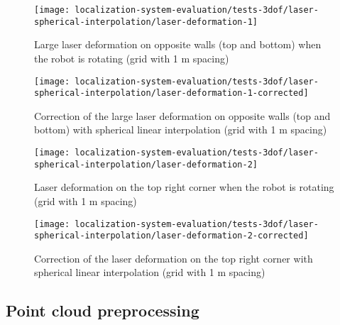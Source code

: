 \begin{figure}[H]
	\centering
	\texttt{[image: localization-system-evaluation/tests-3dof/laser-spherical-interpolation/laser-deformation-1]}
	\caption{Large laser deformation on opposite walls (top and bottom) when the robot is rotating (grid with 1 m spacing)}
	\label{fig:localization-system-evaluation_laser-deformation-1}
\end{figure}

\begin{figure}[H]
	\centering
	\texttt{[image: localization-system-evaluation/tests-3dof/laser-spherical-interpolation/laser-deformation-1-corrected]}
	\caption{Correction of the large laser deformation on opposite walls (top and bottom) with spherical linear interpolation (grid with 1 m spacing)}
	\label{fig:localization-system-evaluation_laser-deformation-1-corrected}
\end{figure}


\begin{figure}[H]
	\centering
	\texttt{[image: localization-system-evaluation/tests-3dof/laser-spherical-interpolation/laser-deformation-2]}
	\caption{Laser deformation on the top right corner when the robot is rotating (grid with 1 m spacing)}
	\label{fig:localization-system-evaluation_laser-deformation-2}
\end{figure}

\begin{figure}[H]
	\centering
	\texttt{[image: localization-system-evaluation/tests-3dof/laser-spherical-interpolation/laser-deformation-2-corrected]}
	\caption{Correction of the laser deformation on the top right corner with spherical linear interpolation (grid with 1 m spacing)}
	\label{fig:localization-system-evaluation_laser-deformation-2-corrected}
\end{figure}



\subsection{Point cloud preprocessing}


